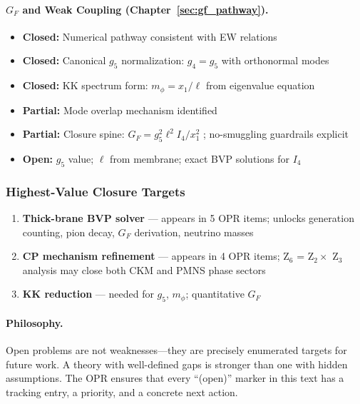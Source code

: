 \paragraph{$G_F$ and Weak Coupling (Chapter~\ref{sec:gf_pathway}).}
\begin{itemize}[nosep]
    \item \textcolor{OliveGreen}{\textbf{Closed:}} Numerical pathway consistent with EW relations \tagDc{}
    \item \textcolor{OliveGreen}{\textbf{Closed:}} Canonical $g_5$ normalization: $g_4 = g_5$ with orthonormal modes \tagDc{}
    \item \textcolor{OliveGreen}{\textbf{Closed:}} KK spectrum form: $m_\phi = x_1/\ell$ from eigenvalue equation \tagDc{}
    \item \textcolor{YellowOrange}{\textbf{Partial:}} Mode overlap mechanism identified \tagP{}
    \item \textcolor{YellowOrange}{\textbf{Partial:}} Closure spine: $G_F = g_5^2 \ell^2 I_4 / x_1^2$ \tagDc{}; no-smuggling guardrails explicit
    \item \textcolor{BrickRed}{\textbf{Open:}} $g_5$ value; $\ell$ from membrane; exact BVP solutions for $I_4$
\end{itemize}

\subsubsection{Highest-Value Closure Targets}

\begin{enumerate}
    \item \textbf{Thick-brane BVP solver} --- appears in 5 OPR items; unlocks generation
          counting, pion decay, $G_F$ derivation, neutrino masses
    \item \textbf{CP mechanism refinement} --- appears in 4 OPR items; Z$_6$ = Z$_2 \times$ Z$_3$
          analysis may close both CKM and PMNS phase sectors
    \item \textbf{KK reduction} --- needed for $g_5$, $m_\phi$; quantitative $G_F$
\end{enumerate}

\paragraph{Philosophy.}
Open problems are not weaknesses---they are precisely enumerated targets for future
work. A theory with well-defined gaps is stronger than one with hidden assumptions.
The OPR ensures that every ``(open)'' marker in this text has a tracking entry,
a priority, and a concrete next action.

